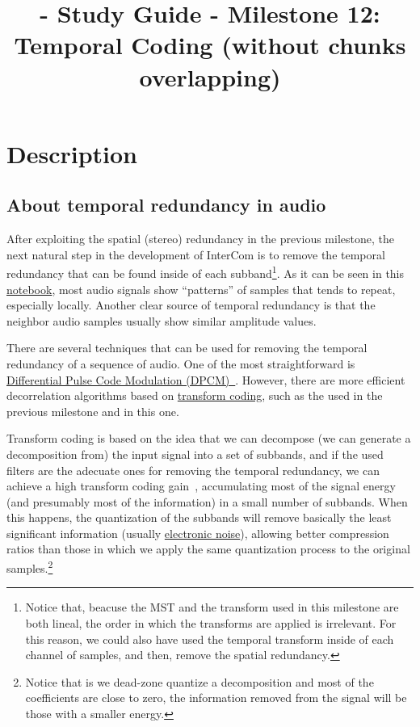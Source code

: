 
\title{\TM{} - Study Guide - Milestone 12: Temporal Coding (without chunks overlapping)}

\maketitle

\section{Description}

\subsection{About temporal redundancy in audio}
After exploiting the spatial (stereo) redundancy in the previous
milestone, the next natural step in the development of InterCom is to
remove the temporal redundancy that can be found inside of each
subband\footnote{Notice that, beacuse the MST and the transform used
  in this milestone are both lineal, the order in which the transforms
  are applied is irrelevant. For this reason, we could also have used
  the temporal transform inside of each channel of samples, and then,
  remove the spatial redundancy.}. As it can be seen in this
\href{https://github.com/Tecnologias-multimedia/intercom/blob/master/tools/audio_viewer.ipynb}{notebook},
most audio signals show ``patterns'' of samples that tends to repeat,
especially locally. Another clear source of temporal redundancy is
that the neighbor audio samples usually show similar amplitude values.

There are several techniques that can be used for removing the
temporal redundancy of a sequence of audio. One of the most
straightforward is
\href{https://en.wikipedia.org/wiki/Differential_pulse-code_modulation}{Differential
  Pulse Code Modulation
  (DPCM)~\cite{sayood2017introduction}}. However, there are more
efficient decorrelation algorithms based on
\href{https://en.wikipedia.org/wiki/Transform_coding}{transform
  coding}, such as the used in the previous milestone and in this one.

Transform coding is based on the idea that we can decompose (we can
generate a decomposition from) the input signal into a set of
subbands, and if the used filters are the adecuate ones for removing
the temporal redundancy, we can achieve a high transform coding
gain~\cite{sayood2017introduction}, accumulating most of the signal
energy (and presumably most of the information) in a small number of
subbands. When this happens, the quantization of the subbands will
remove basically the least significant information (usually
\href{https://en.wikipedia.org/wiki/Noise_(electronics)}{electronic
  noise}), allowing better compression ratios than those in which we
apply the same quantization process to the original
samples.\footnote{Notice that is we dead-zone quantize a decomposition
and most of the coefficients are close to zero, the information
removed from the signal will be those with a smaller energy.}

